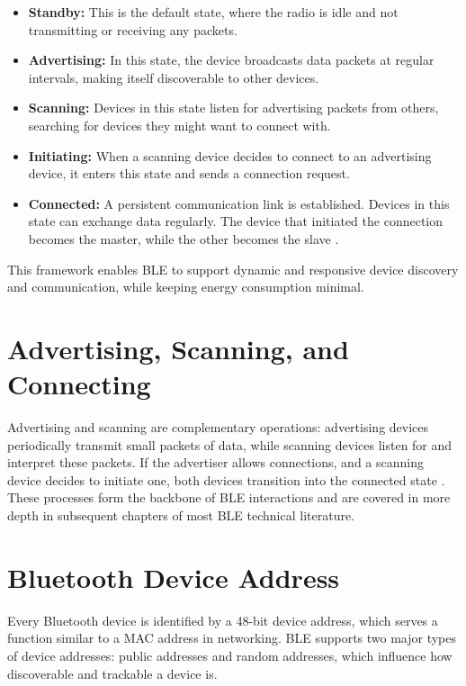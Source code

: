\begin{itemize}
    \item \textbf{Standby:} This is the default state, where the radio is idle and not transmitting or receiving any packets.
    \item \textbf{Advertising:} In this state, the device broadcasts data packets at regular intervals, making itself discoverable to other devices.
    \item \textbf{Scanning:} Devices in this state listen for advertising packets from others, searching for devices they might want to connect with.
    \item \textbf{Initiating:} When a scanning device decides to connect to an advertising device, it enters this state and sends a connection request.
    \item \textbf{Connected:} A persistent communication link is established. Devices in this state can exchange data regularly. The device that initiated the connection becomes the master, while the other becomes the slave \cite{introtoble}.
\end{itemize}

This framework enables BLE to support dynamic and responsive device discovery and communication, while keeping energy consumption minimal.
\section{Advertising, Scanning, and Connecting}

Advertising and scanning are complementary operations: advertising devices periodically transmit small packets of data, while scanning devices listen for and interpret these packets. If the advertiser allows connections, and a scanning device decides to initiate one, both devices transition into the connected state \cite{introtoble}. These processes form the backbone of BLE interactions and are covered in more depth in subsequent chapters of most BLE technical literature.

\section{Bluetooth Device Address}

Every Bluetooth device is identified by a 48-bit device address, which serves a function similar to a MAC address in networking. BLE supports two major types of device addresses: public addresses and random addresses, which influence how discoverable and trackable a device is.

